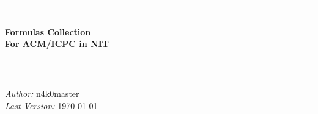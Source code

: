\begin{titlepage}
\begin{center}

\rule{\linewidth}{0.5mm}\\[0.7cm]
{\huge \bfseries Formulas Collection\\[2ex]
       For ACM/ICPC in NIT}\\[0.7cm]
\rule{\linewidth}{0.5mm}\\[0.7cm]

\vfill

\begin{flushright} \large
\emph{Author:} n4k0master\\
\emph{Last Version:} {\large \today}
\end{flushright}

\end{center}
\end{titlepage}
